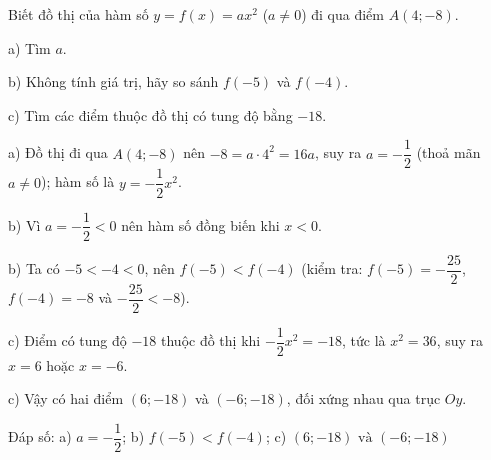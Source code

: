 \begin{problem}[9DS-HSB2-036]
Biết đồ thị của hàm số $y = f(x) = ax^2$ ($a \neq 0$) đi qua điểm $A(4; -8)$.

a) Tìm $a$.

b) Không tính giá trị, hãy so sánh $f(-5)$ và $f(-4)$.

c) Tìm các điểm thuộc đồ thị có tung độ bằng $-18$.

\begin{solution}
a) Đồ thị đi qua $A(4; -8)$ nên $-8 = a \cdot 4^2 = 16a$, suy ra $a = -\dfrac{1}{2}$ (thoả mãn $a \neq 0$); hàm số là $y = -\dfrac{1}{2}x^2$.

b) Vì $a = -\dfrac{1}{2} < 0$ nên hàm số đồng biến khi $x < 0$.

b) Ta có $-5 < -4 < 0$, nên $f(-5) < f(-4)$ (kiểm tra: $f(-5) = -\dfrac{25}{2}$, $f(-4) = -8$ và $-\dfrac{25}{2} < -8$).

c) Điểm có tung độ $-18$ thuộc đồ thị khi $-\dfrac{1}{2}x^2 = -18$, tức là $x^2 = 36$, suy ra $x = 6$ hoặc $x = -6$.

c) Vậy có hai điểm $(6; -18)$ và $(-6; -18)$, đối xứng nhau qua trục $Oy$.

Đáp số: a) $\boxed{a = -\dfrac{1}{2}}$; b) $\boxed{f(-5) < f(-4)}$; c) $\boxed{(6; -18) \text{ và } (-6; -18)}$
\end{solution}
\end{problem}

